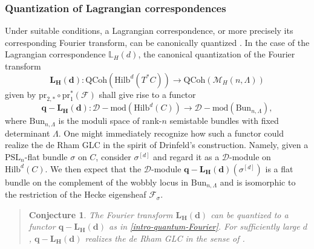 \documentclass[twoside, 11pt]{article}
\numberwithin{equation}{section}
\theoremstyle{theorem}
\numberwithin{theorem}{section}
\newtheorem{conjecture}[conjecture]{Conjecture}
\theoremstyle{definition}
\begin{document}
\subsubsection{Quantization of Lagrangian correspondences}
Under suitable conditions, a Lagrangian correspondence, or more precisely its corresponding Fourier transform, can be canonically quantized \cite{Arinkin-Block-Pantev}. 
In the case of the Lagrangian correspondence $\mathbb{L}_H(d)$, the canonical quantization of the Fourier transform 
\begin{equation}\label{intro-Fourier-lag}
\mathbf{L_H(d)}: \mathrm{QCoh}\left( \mathrm{Hilb}^d(T^\ast C) \right)
\longrightarrow \mathrm{QCoh}\left(\mathcal{M}_H(n, \Lambda)\right)    
\end{equation}
given by $\mathrm{pr}_{2, \ast} \circ \mathrm{pr}_1^\ast (\mathcal{F})$
shall give rise to a functor  
\begin{equation}\label{intro-quantum-Fourier}
\mathbf{q-L_H(d)}: \mathrm{\mathcal{D}-mod}\left( \mathrm{Hilb}^d(C) \right)
\longrightarrow \mathrm{\mathcal{D}-mod}\left(\mathrm{Bun}_{n, \Lambda}\right),
\end{equation}
where $\mathrm{Bun}_{n, \Lambda}$ is the moduli space of rank-$n$ semistable bundles with fixed determinant $\Lambda$.
One might immediately recognize how such a functor could realize the de Rham GLC in the spirit of Drinfeld's construction. Namely, given a $\mathrm{PSL}_n$-flat bundle $\sigma$ on $C$, consider $\sigma^{[d]}$ and regard it as a $\mathcal{D}$-module on $\mathrm{Hilb}^d(C)$. 
We then expect that the $\mathcal{D}$-module $\mathbf{q-L_H(d)}(\sigma^{[d]})$ is a flat bundle on the complement of the wobbly locus in $\mathrm{Bun}_{n, \Lambda}$ and is isomorphic to the restriction of the Hecke eigensheaf $\mathcal{F}_\sigma$.

\vspace{-20pt}
\begin{quote}
\begin{conjecture} \label{intro-conj-quantized-Fourier}
The Fourier transform $\mathbf{L_H(d)}$ can be quantized to a functor $\mathbf{q-L_H(d)}$ as in \eqref{intro-quantum-Fourier}. 
For sufficiently large $d$, $\mathbf{q-L_H(d)}$ realizes the de Rham GLC in the sense of \cite{Drinfeld}.
\end{conjecture}
\end{quote}
\end{document}

